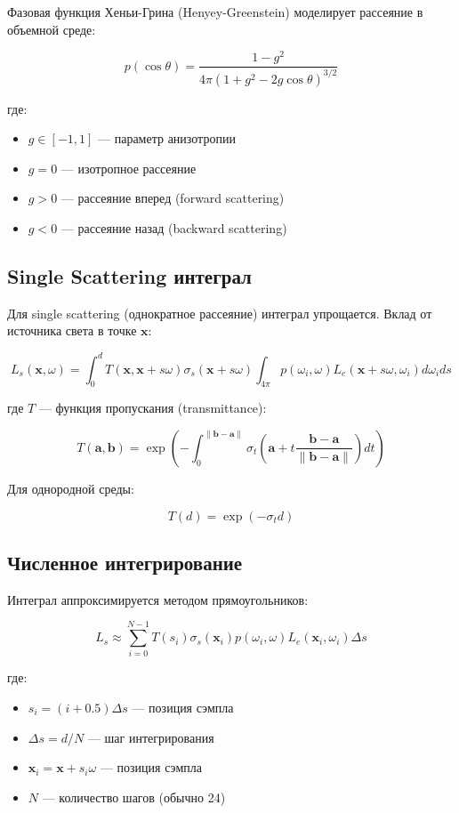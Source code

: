 \documentclass[14pt, a4paper]{extarticle}
\begin{document}
Фазовая функция Хеньи-Грина (Henyey-Greenstein) моделирует рассеяние в объемной среде:

\[
p(\cos\theta) = \frac{1 - g^2}{4\pi(1 + g^2 - 2g\cos\theta)^{3/2}}
\]

где:
\begin{itemize}
    \item $g \in [-1, 1]$ --- параметр анизотропии
    \item $g = 0$ --- изотропное рассеяние
    \item $g > 0$ --- рассеяние вперед (forward scattering)
    \item $g < 0$ --- рассеяние назад (backward scattering)
\end{itemize}

\subsection{Single Scattering интеграл}

Для single scattering (однократное рассеяние) интеграл упрощается. Вклад от источника света в точке $\mathbf{x}$:

\[
L_s(\mathbf{x}, \omega) = \int_0^d T(\mathbf{x}, \mathbf{x} + s\omega) \sigma_s(\mathbf{x} + s\omega) \int_{4\pi} p(\omega_i, \omega) L_e(\mathbf{x} + s\omega, \omega_i) d\omega_i ds
\]

где $T$ --- функция пропускания (transmittance):

\[
T(\mathbf{a}, \mathbf{b}) = \exp\left(-\int_0^{\|\mathbf{b} - \mathbf{a}\|} \sigma_t(\mathbf{a} + t\frac{\mathbf{b} - \mathbf{a}}{\|\mathbf{b} - \mathbf{a}\|}) dt\right)
\]

Для однородной среды:

\[
T(d) = \exp(-\sigma_t d)
\]

\subsection{Численное интегрирование}

Интеграл аппроксимируется методом прямоугольников:

\[
L_s \approx \sum_{i=0}^{N-1} T(s_i) \sigma_s(\mathbf{x}_i) p(\omega_i, \omega) L_e(\mathbf{x}_i, \omega_i) \Delta s
\]

где:
\begin{itemize}
    \item $s_i = (i + 0.5)\Delta s$ --- позиция сэмпла
    \item $\Delta s = d/N$ --- шаг интегрирования
    \item $\mathbf{x}_i = \mathbf{x} + s_i \omega$ --- позиция сэмпла
    \item $N$ --- количество шагов (обычно 24)
\end{itemize}
\end{document}
